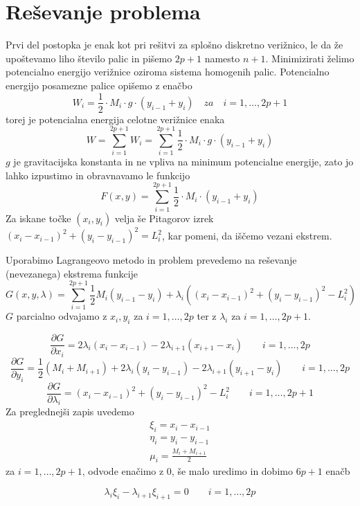 \documentclass[A4paper, 11pt]{article}
\begin{document}
\section{Reševanje problema}

Prvi del postopka je enak kot pri rešitvi za splošno diskretno verižnico, le da že upoštevamo liho število palic in pišemo $2p+1$ namesto $n+1$. 
Minimizirati želimo potencialno energijo verižnice oziroma sistema homogenih palic. Potencialno energijo posamezne palice opišemo z enačbo
\[ W_i = \frac{1}{2} \cdot M_i \cdot g \cdot (y_{i-1} + y_i) \quad za \quad i=1, \ldots, 2p+1 \]
torej je potencialna energija celotne verižnice enaka
\[ W = \sum_{i=1}^{2p+1} W_i = \sum_{i=1}^{2p+1} \frac{1}{2} \cdot M_i \cdot g \cdot (y_{i-1} + y_i) \]
$g$ je gravitacijska konstanta in ne vpliva na minimum potencialne energije, zato jo lahko izpustimo in obravnavamo le funkcijo
\[ F(x,y) = \sum_{i=1}^{2p+1} \frac{1}{2} \cdot M_i \cdot (y_{i-1} + y_i) \]
Za iskane točke $(x_i,y_i)$ velja še Pitagorov izrek $(x_i - x_{i-1})^2 + (y_i - y_{i-1})^2 = L_i ^2$, kar pomeni, da iščemo vezani ekstrem. 

Uporabimo Lagrangeovo metodo in problem prevedemo na reševanje (nevezanega) ekstrema funkcije
\[ G(x,y,\lambda) = \sum_{i=1}^{2p+1} \frac{1}{2} M_i (y_{i-1} - y_i) + \lambda_i ((x_i - x_{i-1})^2 + (y_i - y_{i-1})^2 - L_i ^2) \]
$G$ parcialno odvajamo z $x_i, y_i$ za $i=1, \ldots, 2p$ ter z $\lambda_i$ za $i=1, \ldots, 2p+1$.

\[ \frac{\partial G}{\partial x_i} = 2\lambda_i (x_i - x_{i-1}) - 2\lambda_{i+1} (x_{i+1} - x_i) \qquad i=1, \ldots, 2p \]
\[ \frac{\partial G}{\partial y_i} = \frac{1}{2} (M_i + M_{i+1}) + 2\lambda_i (y_i - y_{i-1}) - 2\lambda_{i+1} (y_{i+1} - y_i) \qquad  i=1, \ldots, 2p \]
\[ \frac{\partial G}{\partial \lambda_i} = (x_i - x_{i-1})^2 + (y_i - y_{i-1})^2 - L_i ^2 \qquad i=1, \ldots, 2p+1 \]
Za preglednejši zapis uvedemo 
\begin{equation}
\begin{split}
\xi_i = x_i - x_{i-1} \\
\eta_i = y_i - y_{i-1} \\
\mu_i = \frac{M_i + M_{i+1}}{2}
\end{split}
\end{equation}
za $i=1, \ldots, 2p+1$, odvode enačimo z 0, še malo uredimo in dobimo $6p+1$ enačb

\begin{equation}
\lambda_i \xi_i - \lambda_{i+1} \xi_{i+1} = 0 \qquad i=1, \ldots, 2p 
\end{equation}
\end{document}
